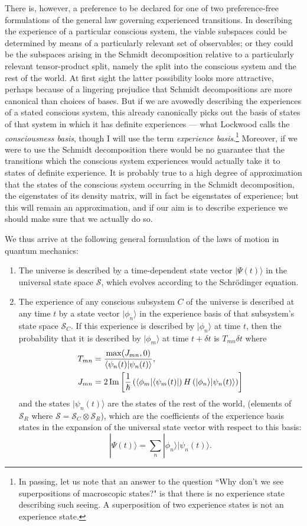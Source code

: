 \documentclass[12pt,a4paper,reqno]{article}
\renewcommand{\(}{\left(}
\renewcommand{\)}{\right)}
\renewcommand{\hbar}{\hslash}
\renewcommand{\S}{\mathcal{S}}
\newcommand{\ox}{\otimes}
\newcommand{\<}{\langle}
\renewcommand{\>}{\rangle}
\renewcommand{\Im}{\operatorname{Im}}
\theoremstyle{plain} %
\theoremstyle{definition}
\theoremstyle{remark}
\begin{document}
There is, however, a preference to be declared for one of two
preference-free formulations of the general law governing experienced
transitions. In describing the experience of a particular conscious
system, the viable subspaces could be determined by means of a
particularly relevant set of observables; or they could be the subspaces
arising in the Schmidt decomposition relative to a particularly relevant
tensor-product split, namely the split into the conscious system and the
rest of the world. At first sight the latter possibility looks more
attractive, perhaps because of a lingering prejudice that Schmidt
decompositions are more canonical than choices of bases. But if we
are avowedly describing the experiences of a stated conscious system,
this already canonically picks out the basis of states of that system in
which it has definite experiences --- what Lockwood \cite{Lockwood:manyminds}
calls the \emph{consciousness basis}, though I will use the term
\emph{experience basis}.\footnote{In passing, let us note that an answer to the
question ``Why don't we see superpositions of macroscopic states?" is
that there is no experience state describing such seeing. A
superposition of two experience states is not an experience
state.} Moreover, if we were to use the Schmidt decomposition there
would be no guarantee that the transitions which the conscious system
experiences would actually take it to states of definite experience. It
is probably true to a high degree of approximation that the states of
the conscious system occurring in the Schmidt decomposition, the
eigenstates of its density matrix, will in fact be eigenstates of
experience; but this will remain an approximation, and if our aim is to
describe experience we should make sure that we actually do so.


We thus arrive at the following general formulation of the laws of
motion in quantum mechanics:

\begin{enumerate}
\item The universe is described by a time-dependent state vector 
$|\Psi(t)\>$ in the universal state space $\S$,
which evolves according to the Schr\"odinger equation. 
\item The experience of any conscious subsystem $C$ of the universe is 
described at any time $t$ by a state vector $|\phi_n\>$ in the experience basis
of that subsystem's state space $\S_C$. If this experience is described by
$|\phi_n\>$ at time $t$, then the probability that it is described by
$|\phi_m\>$ at time $t+\delta t$ is $T_{mn}\delta t$ where
\begin{align}
T_{mn} &= \frac{\max(J_{mn},0)}{\<\psi_n(t)|\psi_n(t)\>},\\
J_{mn} &= 
2\Im\left[{1\over \hbar}\(\<\phi_m|\<\psi_m(t)|\)H\(|\phi_n\>|\psi_n(t)\>\)\right] 
\end{align}
and the states $|\psi_n(t)\>$ are the states of the rest of the world,
(elements of $\S_R$ where $\S = \S_C\ox\S_R$),
which are the coefficients of the experience basis states in the
expansion of the universal state vector with respect to this basis:
\[
|\Psi(t)\> = \sum_n|\phi_n\>|\psi_n(t)\>.
\]
\end{enumerate}
\end{document}
